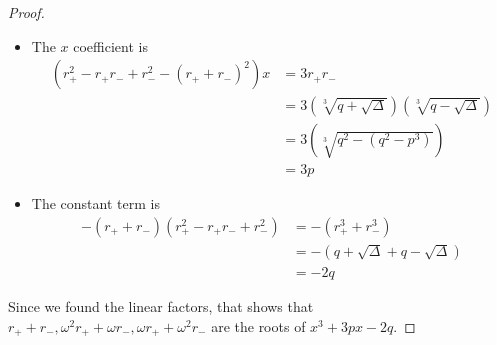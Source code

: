 \documentclass{article}
\begin{document}
\begin{itemize}
\begin{proof}
\begin{itemize}
                        \item The $x$ coefficient is 
                            \begin{align*}
                                (r_{+}^{2} - r_{+}r_{-} + r_{-}^{2} - (r_{+} + r_{-})^{2})x &=  3r_{+}r_{-}                                                 \\
                                                                                            &=  3(\sqrt[3]{q + \sqrt{\Delta}})(\sqrt[3]{q - \sqrt{\Delta}}) \\
                                                                                            &=  3(\sqrt[3]{q^{2} - (q^{2} - p^{3})})                        \\
                                                                                            &= 3p                                                            
                            \end{align*}

                        \item The constant term is 
                            \begin{align*}
                                -(r_{+} + r_{-})(r_{+}^{2} - r_{+}r_{-} + r_{-}^{2}) &= -(r_{+}^{3} + r_{-}^{3})                 \\
                                                                                     &= -(q + \sqrt{\Delta} + q - \sqrt{\Delta}) \\
                                                                                     &= -2q                                        
                            \end{align*}
                    \end{itemize}
                Since we found the linear factors, that shows that $r_{+} + r_{-}, \omega^{2}r_{+} + \omega r_{-}, \omega r_{+} + \omega^{2} r_{-}$ are the roots of $x^{3} + 3px - 2q$.
            \end{proof}


\end{itemize}
\end{document}

